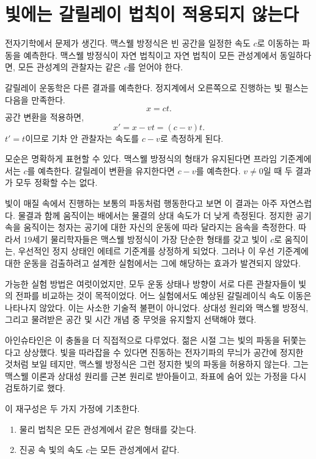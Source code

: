 \section{빛에는 갈릴레이 법칙이 적용되지 않는다}

전자기학에서 문제가 생긴다. 맥스웰 방정식은 빈 공간을 일정한 속도 \(c\)로 이동하는 파동을 예측한다. 맥스웰 방정식이 자연 법칙이고 자연 법칙이 모든 관성계에서 동일하다면, 모든 관성계의 관찰자는 같은 \(c\)를 얻어야 한다.

갈릴레이 운동학은 다른 결과를 예측한다. 정지계에서 오른쪽으로 진행하는 빛 펄스는 다음을 만족한다.
\begin{equation}
x=ct.
\end{equation}
공간 변환을 적용하면,
\begin{equation}
x'=x-vt=(c-v)t.
\end{equation}
\(t'=t\)이므로 기차 안 관찰자는 속도를 \(c-v\)로 측정하게 된다.

모순은 명확하게 표현할 수 있다. 맥스웰 방정식의 형태가 유지된다면 프라임 기준계에서는 \(c\)를 예측한다. 갈릴레이 변환을 유지한다면 \(c-v\)를 예측한다. \(v\ne0\)일 때 두 결과가 모두 정확할 수는 없다.

빛이 매질 속에서 진행하는 보통의 파동처럼 행동한다고 보면 이 결과는 아주 자연스럽다. 물결과 함께 움직이는 배에서는 물결의 상대 속도가 더 낮게 측정된다. 정지한 공기 속을 움직이는 청자는 공기에 대한 자신의 운동에 따라 달라지는 음속을 측정한다. 따라서 19세기 물리학자들은 맥스웰 방정식이 가장 단순한 형태를 갖고 빛이 \(c\)로 움직이는, 우선적인 정지 상태인 에테르 기준계를 상정하게 되었다. 그러나 이 우선 기준계에 대한 운동을 검출하려고 설계한 실험에서는 그에 해당하는 효과가 발견되지 않았다.

가능한 실험 방법은 여럿이었지만, 모두 운동 상태나 방향이 서로 다른 관찰자들이 빛의 전파를 비교하는 것이 목적이었다. 어느 실험에서도 예상된 갈릴레이식 속도 이동은 나타나지 않았다. 이는 사소한 기술적 불편이 아니었다. 상대성 원리와 맥스웰 방정식, 그리고 물려받은 공간 및 시간 개념 중 무엇을 유지할지 선택해야 했다.

아인슈타인은 이 충돌을 더 직접적으로 다루었다. 젊은 시절 그는 빛의 파동을 뒤쫓는다고 상상했다. 빛을 따라잡을 수 있다면 진동하는 전자기파의 무늬가 공간에 정지한 것처럼 보일 테지만, 맥스웰 방정식은 그런 정지한 빛의 파동을 허용하지 않는다. 그는 맥스웰 이론과 상대성 원리를 근본 원리로 받아들이고, 좌표에 숨어 있는 가정을 다시 검토하기로 했다.

이 재구성은 두 가지 가정에 기초한다.
\begin{enumerate}
\item 물리 법칙은 모든 관성계에서 같은 형태를 갖는다.
\item 진공 속 빛의 속도 \(c\)는 모든 관성계에서 같다.
\end{enumerate}

